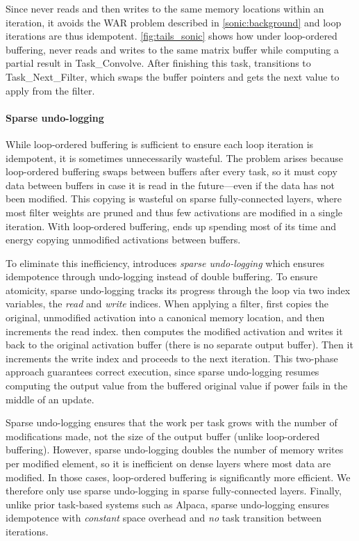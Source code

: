 Since \sonic never reads and then writes to the same memory locations within an iteration,
it avoids the WAR problem described in \autoref{sonic:background}
and loop iterations are thus idempotent.
%
\autoref{fig:tails_sonic} shows how under loop-ordered buffering, \sonic never 
reads and writes to the same matrix buffer while computing a partial result in \textsf{Task\_Convolve}.
After finishing this task, \sonic transitions to \textsf{Task\_Next\_Filter}, which swaps the buffer pointers
and gets the next value to apply from the filter.

\paragraph{Sparse undo-logging}
While loop-ordered buffering is sufficient to ensure each loop iteration is idempotent,
it is sometimes unnecessarily wasteful.
%
The problem arises because loop-ordered buffering swaps between buffers after every task,
so it must copy data between buffers in case it is read in the future---even if the data has not been modified.
%
This copying is wasteful on sparse fully-connected layers,
where most filter weights are pruned and thus few activations are modified in a single iteration.
%
With loop-ordered buffering, \sonic ends up spending most of its time 
and energy copying unmodified activations between buffers.

To eliminate this inefficiency, \sonic introduces \emph{sparse undo-logging}
which ensures idempotence through undo-loggi\-ng instead of double buffering.
To ensure atomicity, sparse undo-logging tracks its progress through the loop via two index variables,
the \emph{read} and \emph{write} indices.
When applying a filter,
\sonic first copies the original, unmodified activation into a canonical memory location,
and then increments the read index.
\sonic then computes the modified activation and writes it back to the original activation buffer
(there is no separate output buffer).
Then it increments the write index and proceeds to the next iteration.
This two-phase approach guarantees correct execution,
since sparse undo-logging resumes computing the output value from the buffered original value if power fails in the middle of an update.

Sparse undo-logging ensures that the work per task grows with the number of modifications made,
not the size of the output buffer (unlike loop-ordered buffering).
However, sparse undo-logging doubles the number of memory writes per modified element,
so it is inefficient on dense layers where most data are modified.
In those cases, loop-ordered buffering is significantly more efficient.
We therefore only use sparse undo-logging in sparse fully-connected layers.
Finally, unlike prior task-based systems such as Alpaca,
sparse undo-logging ensures idempotence with \emph{constant} space overhead
and \emph{no} task transition between iterations.

